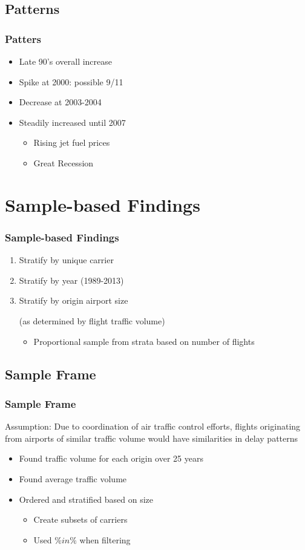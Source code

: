 \documentclass{beamer}
\begin{document}
\subsection{Patterns}
\begin{frame}
\frametitle{Patters}
\begin{itemize}
\item Late 90's overall increase
\item Spike at 2000: possible 9/11
\item Decrease at 2003-2004
\item Steadily increased until 2007 
\begin{itemize}
\item Rising jet fuel prices 
\item Great Recession 
\end{itemize}
\end{itemize}

\end{frame}

\section{Sample-based Findings}
\begin{frame}
\frametitle{Sample-based Findings}
\begin{enumerate}
\item Stratify by unique carrier
\item Stratify by year (1989-2013)
\item Stratify by origin airport size 

(as determined by flight traffic volume)
\begin{itemize}
\item Proportional sample from strata based on number of flights 
\end{itemize}
\end{enumerate}

\end{frame}

\subsection{Sample Frame}
\begin{frame}
\frametitle{Sample Frame}
Assumption: Due to coordination of air traffic control efforts, flights originating from airports of similar traffic volume would have similarities in delay patterns
\begin{itemize}
\item Found traffic volume for each origin over 25 years 
\item Found average traffic volume 
\item Ordered and stratified based on size
\begin{itemize}
\item Create subsets of carriers 
\item Used $\%in\%$ when filtering
\end{itemize}
\end{itemize}
\end{frame}
\end{document}

